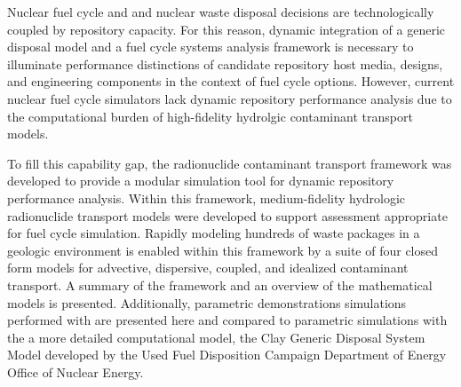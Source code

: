 

Nuclear fuel cycle and and nuclear waste disposal decisions are
technologically coupled by repository capacity.  For this reason, dynamic
integration of a generic disposal model and a fuel cycle systems analysis
framework is necessary to illuminate performance distinctions of candidate
repository host media, designs, and engineering components in the context of
fuel cycle options. However, current nuclear fuel cycle simulators lack dynamic
repository performance analysis due to the computational burden of
high-fidelity hydrolgic contaminant transport models.

To fill this capability gap, the \Cyder radionuclide contaminant transport
framework was developed to provide a modular simulation tool for dynamic
repository performance
analysis.  Within this framework, medium-fidelity hydrologic radionuclide
transport models were developed to support assessment appropriate for fuel
cycle simulation. Rapidly modeling hundreds of waste packages in a geologic
environment is enabled within this framework by a suite of four closed form
models for advective, dispersive, coupled, and idealized contaminant transport.
A summary of the framework and an overview of the mathematical models is
presented. Additionally, parametric demonstrations simulations performed with
\Cyder are presented here and compared to parametric simulations with the
a more detailed computational model, the Clay Generic Disposal System Model
developed by the Used Fuel Disposition Campaign Department of Energy Office of
Nuclear Energy.
